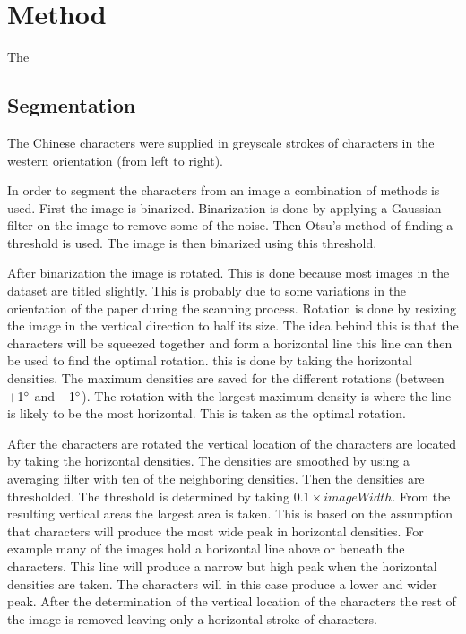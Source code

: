 \section{Method} %
\label{sec:method}

The 

\subsection{Segmentation}


The Chinese characters were supplied in greyscale strokes of characters in the western orientation (from left to right).

In order to segment the characters from an image a combination of methods is used. First the image is binarized. Binarization is done by applying a Gaussian filter on the image to remove some of the noise. Then Otsu's method of finding a threshold is used. The image is then binarized using this threshold.


After binarization the image is rotated. This is done because most images in the dataset are titled slightly. This is probably due to some variations in the orientation of the paper during the scanning process. Rotation is done by resizing the image in the vertical direction to half its size. The idea behind this is that the characters will be squeezed together and form a horizontal line this line can then be used to find the optimal rotation. this is done by taking the horizontal densities. The maximum densities are saved for the different rotations (between $+1\degree$ and $-1\degree$). The rotation with the largest maximum density is where the line is likely to be the most horizontal. This is taken as the optimal rotation. 


After the characters are rotated the vertical location of the characters are located by taking the horizontal densities. The densities are smoothed by using a averaging filter with ten of the neighboring densities. Then the densities are thresholded. The threshold is determined by taking $0.1 \times imageWidth$. From the resulting vertical areas the largest area is taken. This is based on the assumption that characters will produce the most wide peak in horizontal densities. For example many of the images hold a horizontal line above or beneath the characters. This line will produce a narrow but high peak when the horizontal densities are taken. The characters will in this case produce a lower and wider peak. After the determination of the vertical location of the characters the rest of the image is removed leaving only a horizontal stroke of characters.

